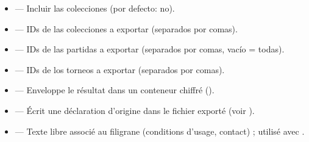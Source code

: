\documentclass[letterpaper,10pt,spanish]{sphinxmanual}
\begin{document}
\begin{itemize}
\item {} 
\sphinxAtStartPar
{} — Incluir las colecciones (por defecto: no).

\item {} 
\sphinxAtStartPar
{} — IDs de las colecciones a exportar (separados por comas).

\item {} 
\sphinxAtStartPar
{} — IDs de las partidas a exportar (separados por comas, vacío = todas).

\item {} 
\sphinxAtStartPar
{} — IDs de los torneos a exportar (separados por comas).

\item {} 
\sphinxAtStartPar
{} — Enveloppe le résultat dans un conteneur chiffré ().

\item {} 
\sphinxAtStartPar
{} — Écrit une déclaration d’origine  dans le fichier
exporté (voir {\hyperref[\detokenize{manuel:diffusion-controlee}]{}}).

\item {} 
\sphinxAtStartPar
{} — Texte libre associé au filigrane (conditions
d’usage, contact) ; utilisé avec .

\end{itemize}

\sphinxAtStartPar
{}
\end{document}

